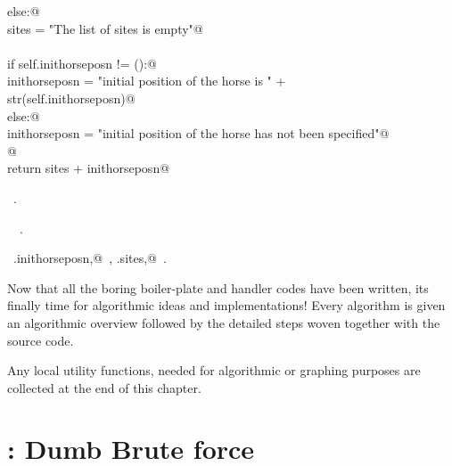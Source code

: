 \documentclass[11.5pt]{report}
\begin{document}
\begin{flushleft}
\begin{list}{}{}
\mbox{}\verb@          else:@\\
\mbox{}\verb@              sites = "The list of sites is empty"@\\
\mbox{}\verb@@\\
\mbox{}\verb@          if self.inithorseposn != ():@\\
\mbox{}\verb@              inithorseposn = "\nThe initial position of the horse is " + \@\\
\mbox{}\verb@                               str(self.inithorseposn)@\\
\mbox{}\verb@          else:@\\
\mbox{}\verb@              inithorseposn = "\nThe initial position of the horse has not been specified"@\\
\mbox{}\verb@              @\\
\mbox{}\verb@          return sites + inithorseposn@\\
\mbox{}\verb@@{\NWsep}
\end{list}
\vspace{-1.5ex}
\footnotesize
\begin{list}{}{\setlength{\itemsep}{-\parsep}\setlength{\itemindent}{-\leftmargin}}
\item \NWtxtMacroRefIn\ .
\item \NWtxtIdentsDefed\nobreak\  \verb@HorseFlyInput@\nobreak\ .\item \NWtxtIdentsUsed\nobreak\  \verb@self.inithorseposn,@\nobreak\ , \verb@self.sites,@\nobreak\ .
\item{}
\end{list}
\vspace{4ex}
\end{flushleft}


Now that all the boring boiler-plate and handler codes have been 
written, its finally time for algorithmic ideas and implementations! 
Every algorithm is given an algorithmic overview followed by the 
detailed steps woven together with the source code. 

Any local utility functions, needed for algorithmic or graphing purposes 
are collected at the end of this chapter. 

\newpage

\section{: Dumb Brute force}
\end{document}

